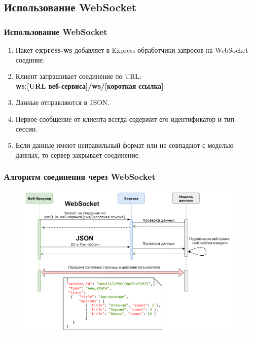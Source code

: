 \documentclass{beamer}
\begin{document}

\subsection{Использование WebSocket}
\begin{frame}
\frametitle{Использование WebSocket}
	\begin{enumerate}
		\item Пакет \textbf{express-ws} добавляет в Express обработчики запросов на WebSocket-соединие.
		\item Клиент запрашивает соединение по URL:\\ \textbf{ws:[URL веб-сервиса]/ws/[короткая ссылка]}	  
		\item Данные отправляются в JSON. 
		\item Первое сообщение от клиента всегда содержит его идентификатор и тип сессии. 
		\item Если данные имеют неправильный формат или не совпадают с моделью данных, то сервер закрывает соединение.
	\end{enumerate}
\end{frame}

\begin{frame}
\frametitle{Алгоритм соединения через WebSocket}
\begin{figure}
	\includegraphics[width=\linewidth]{img/wsdiagram.png}
\end{figure}
\end{frame}
\end{document}
